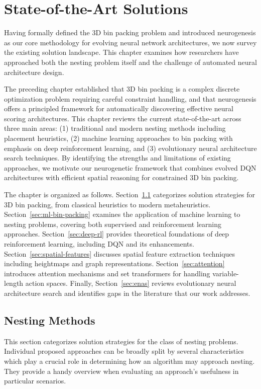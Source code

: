 \chapter{State-of-the-Art Solutions}

Having formally defined the 3D bin packing problem and introduced neurogenesis as our core methodology for evolving neural network architectures, we now survey the existing solution landscape. This chapter examines how researchers have approached both the nesting problem itself and the challenge of automated neural architecture design.

The preceding chapter established that 3D bin packing is a complex discrete optimization problem requiring careful constraint handling, and that neurogenesis offers a principled framework for automatically discovering effective neural scoring architectures. This chapter reviews the current state-of-the-art across three main areas: (1) traditional and modern nesting methods including placement heuristics, (2) machine learning approaches to bin packing with emphasis on deep reinforcement learning, and (3) evolutionary neural architecture search techniques. By identifying the strengths and limitations of existing approaches, we motivate our neurogenetic framework that combines evolved DQN architectures with efficient spatial reasoning for constrained 3D bin packing.

The chapter is organized as follows. Section~\ref{sec:nesting-methods} categorizes solution strategies for 3D bin packing, from classical heuristics to modern metaheuristics. Section~\ref{sec:ml-bin-packing} examines the application of machine learning to nesting problems, covering both supervised and reinforcement learning approaches. Section~\ref{sec:deep-rl} provides theoretical foundations of deep reinforcement learning, including DQN and its enhancements. Section~\ref{sec:spatial-features} discusses spatial feature extraction techniques including heightmaps and graph representations. Section~\ref{sec:attention} introduces attention mechanisms and set transformers for handling variable-length action spaces. Finally, Section~\ref{sec:enas} reviews evolutionary neural architecture search and identifies gaps in the literature that our work addresses.

\section{Nesting Methods}
\label{sec:nesting-methods}

This section categorizes solution strategies for the class of nesting problems. Individual proposed approaches can be broadly split by several characteristics which play a crucial role in determining how an algorithm may approach nesting. They provide a handy overview when evaluating an approach's usefulness in particular scenarios.

